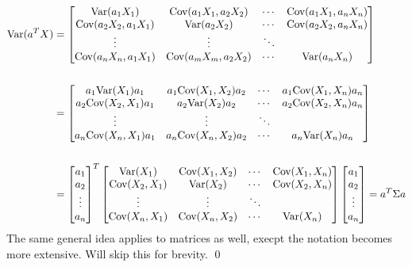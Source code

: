 \begin{align*}
    \text{Var}(a^TX) &=
    \begin{bmatrix} 
        \text{Var}(a_1X_1) & \text{Cov}(a_1X_1, a_2X_2)& \cdots & \text{Cov}(a_1X_1, a_nX_n) \\ 
        \text{Cov}(a_2X_2, a_1X_1) & \text{Var}(a_2X_2) & \cdots & \text{Cov}(a_2X_2,a_nX_n) \\ 
        \vdots & \vdots & \ddots & \\ 
        \text{Cov}(a_nX_n, a_1X_1) & \text{Cov}(a_mX_m, a_2X_2) & \cdots & \text{Var}(a_nX_n) \\ 
    \end{bmatrix} \\&\\
    &= 
    \begin{bmatrix} 
        a_1\text{Var}(X_1)a_1 & a_1\text{Cov}(X_1, X_2)a_2 & \cdots & a_1\text{Cov}(X_1, X_n)a_n \\ 
        a_2\text{Cov}(X_2, X_1)a_1 & a_2\text{Var}(X_2)a_2 & \cdots & a_2\text{Cov}(X_2,X_n)a_n \\ 
        \vdots & \vdots & \ddots & \\ 
        a_n\text{Cov}(X_n, X_1)a_1 & a_n\text{Cov}(X_n, X_2)a_2 & \cdots & a_n\text{Var}(X_n)a_n \\ 
    \end{bmatrix} \\&\\
    &=
\begin{bmatrix} 
    a_1 \\ 
    a_2 \\ 
    \vdots \\ 
    a_n \\ 
\end{bmatrix}^T
    \begin{bmatrix} 
        \text{Var}(X_1)         & \text{Cov}(X_1, X_2) & \cdots & \text{Cov}(X_1, X_n) \\ 
        \text{Cov}(X_2, X_1)  & \text{Var}(X_2)        & \cdots & \text{Cov}(X_2,X_n) \\ 
        \vdots & \vdots & \ddots & \\ 
        \text{Cov}(X_n, X_1)  & \text{Cov}(X_n, X_2) & \cdots & \text{Var}(X_n) \\ 
    \end{bmatrix} 
    \begin{bmatrix} 
        a_1 \\ 
        a_2 \\ 
        \vdots \\ 
        a_n \\ 
    \end{bmatrix} =
    a^T\Sigma a
\end{align*}
The same general idea applies to matrices as well, execpt the notation becomes more
extensive. Will skip this for brevity. \qed

